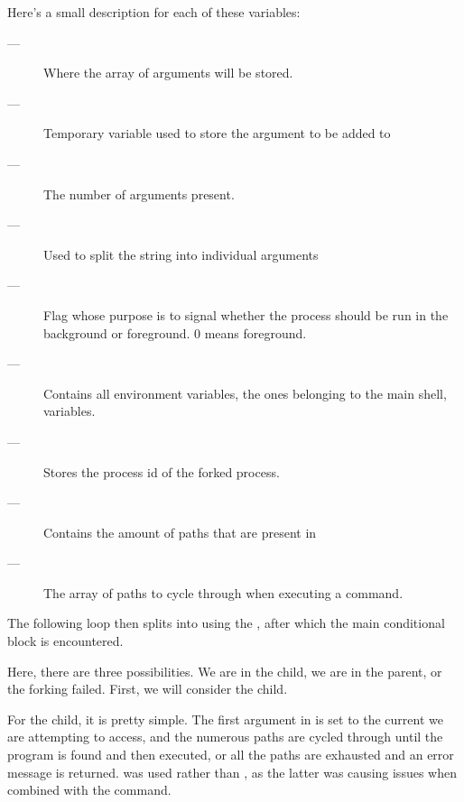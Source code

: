 \documentclass[12pt, a4paper]{report}
\begin{document}
                Here's a small description for each of these variables:
                
                \begin{description}
                    \item[ --- ] 
                        Where the array of arguments will be stored.
                    \item[ --- ]
                        Temporary variable used to store the argument to be 
                        added to 
                    \item[ --- ]
                        The number of arguments present.
                    \item[ --- ]
                        Used to split the  string into individual
                        arguments
                    \item[ --- ]
                        Flag whose purpose is to signal whether the process should
                        be run in the background or foreground. 0 means foreground.
                    \item[ --- ]
                        Contains all environment variables, the ones belonging to
                        the main shell,   variables.
                    \item[ --- ]
                        Stores the process id of the forked process.
                    \item[ --- ]
                        Contains the amount of paths that are present in 
                    \item[ --- ]
                        The array of paths to cycle through when executing a command. 
                \end{description}

                The following loop then splits  into 
                using the , after which the main 
                conditional block is encountered.

                Here, there are three possibilities. We are in the child,
                we are in the parent, or the forking failed. First, we will
                consider the child.

                For the child, it is pretty simple. The first argument in
                 is set to the current  we are attempting
                to access, and the numerous paths are cycled through until 
                the program is found and then executed, or all the paths are
                exhausted and an error message is returned. 
                was used rather than , as the latter was causing
                issues when combined with the  command.
\end{document}
